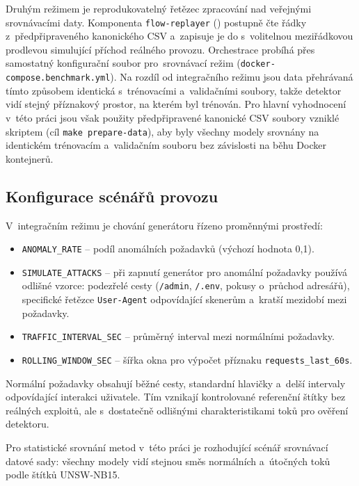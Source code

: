 Druhým režimem je reprodukovatelný řetězec zpracování nad veřejnými srovnávacími daty.
Komponenta \texttt{flow-replayer} () postupně čte řádky z~předpřipraveného kanonického CSV a~zapisuje je do  s~volitelnou meziřádkovou prodlevou simulující příchod reálného provozu.
Orchestrace probíhá přes samostatný konfigurační soubor pro~srovnávací režim (\mbox{\texttt{docker-compose.benchmark.yml}}).
Na rozdíl od integračního režimu jsou data přehrávaná tímto způsobem identická s~trénovacími a~validačními soubory, takže detektor vidí stejný příznakový prostor, na kterém byl trénován.
Pro hlavní vyhodnocení v~této práci jsou však použity předpřipravené kanonické CSV soubory vzniklé skriptem  (cíl \texttt{make prepare-data}), aby byly všechny modely srovnány na identickém trénovacím a~validačním souboru bez závislosti na běhu Docker kontejnerů.

\subsection{Konfigurace scénářů provozu}
\label{sec:konfigurace}

V~integračním režimu je chování generátoru řízeno proměnnými prostředí:

\begin{itemize}
\item \texttt{ANOMALY\_RATE} -- podíl anomálních požadavků (výchozí hodnota 0{,}1).
\item \texttt{SIMULATE\_ATTACKS} -- při zapnutí generátor pro anomální požadavky používá odlišné vzorce: podezřelé cesty (\texttt{/admin}, \texttt{/.env}, pokusy o~průchod adresářů), specifické řetězce \texttt{User-Agent} odpovídající skenerům a~kratší mezidobí mezi požadavky.
\item \texttt{TRAFFIC\_INTERVAL\_SEC} -- průměrný interval mezi normálními požadavky.
\item \texttt{ROLLING\_WINDOW\_SEC} -- šířka okna pro výpočet příznaku \texttt{requests\_last\_60s}.
\end{itemize}

Normální požadavky obsahují běžné cesty, standardní hlavičky a~delší intervaly odpovídající interakci uživatele. Tím vznikají kontrolované referenční štítky bez reálných exploitů, ale s~dostatečně odlišnými charakteristikami toků pro ověření detektoru.

Pro statistické srovnání metod v~této práci je rozhodující scénář srovnávací datové sady: všechny modely vidí stejnou směs normálních a~útočných toků podle štítků UNSW-NB15.

